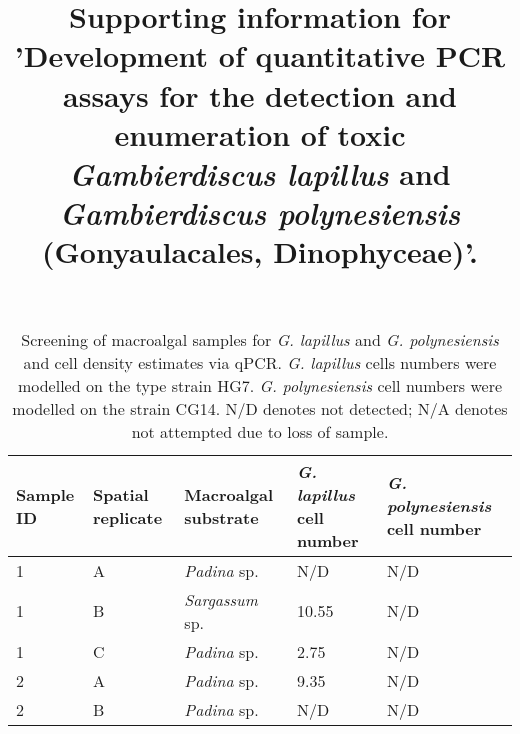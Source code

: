\documentclass[12pt]{article}
\title{Supporting information for 'Development of quantitative PCR assays for the detection and enumeration of toxic \emph{Gambierdiscus lapillus} and \emph{Gambierdiscus polynesiensis} (Gonyaulacales, Dinophyceae)'.}
\date{}
\begin{document}
\maketitle
\FloatBarrier
\begin{longtable}{ | p{2cm} | p{2cm} | p{3cm} | p{3.5cm} | p{3.5cm} | }
\caption{Screening of macroalgal samples for \emph{G. lapillus} and \emph{G. polynesiensis} and cell density estimates via qPCR. \emph{G. lapillus} cells numbers were modelled on the type strain HG7. \emph{G. polynesiensis} cell numbers were modelled on the strain CG14. N/D denotes not detected; N/A denotes not attempted due to loss of sample.}\\
\hline
\label{tbl:MacroalgaeTable}
\textbf{Sample ID}&\textbf{Spatial replicate}&\textbf{Macroalgal substrate}&\textbf{\textit{G. lapillus} cell number}&\textbf{\textit{G. polynesiensis} cell number}\\
\hline
1&A&\emph{Padina} sp.&N/D&N/D\\
\hline
1&B&\emph{Sargassum} sp.&10.55
&N/D\\
\hline
1&C&\emph{Padina} sp.&2.75
&N/D\\
\hline
2 %
&A&\emph{Padina} sp.&9.35&N/D\\
\hline
2 %
&B&\emph{Padina} sp.&N/D&N/D\\

\end{longtable}
\end{document}
